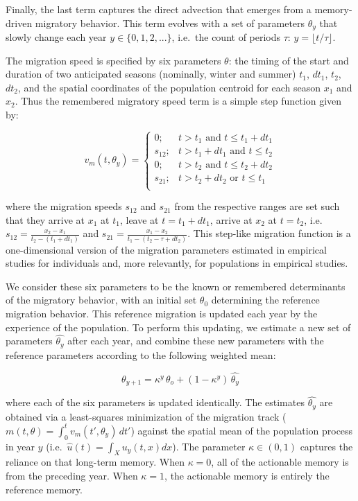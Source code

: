 \documentclass[12pt]{article}
\begin{document}
Finally, the last term captures the direct advection that emerges from a memory-driven migratory behavior. This term evolves with a set of parameters $\theta_y$ that slowly change each year $y \in \{0,1,2,...\}$, i.e.~the count of periods $\tau$: $y = \lfloor t/\tau \rfloor$.

The migration speed is specified by six parameters $\theta$: the timing of the start and duration of two anticipated seasons (nominally, winter and summer) $t_1$, $dt_1$, $t_2$, $dt_2$, and the spatial coordinates of the population centroid for each season $x_1$ and $x_2$. Thus the remembered migratory speed term is a simple step function given by:

\begin{equation}
v_m(t, \theta_y) = \begin{cases}
0; & t > t_1  \,\, \text{and} \,\, t \leq t_1 + dt_1 \\ 
s_{12}; & t > t_1 + dt_1 \,\, \text{and} \,\,  t \leq t_2 \\ 
0; & t> t_2 \,\, \text{and} \,\, t \leq t_2 + dt_2 \\ 
s_{21}; &  t > t_2+dt_2 \,\, \text{or} \,\, t \leq t_1\\ 
\end{cases}
\end{equation}

\noindent where the migration speeds $s_{12}$ and $s_{21}$ from the respective ranges are set such that they arrive at $x_1$ at $t_1$, leave at $t = t_1 + dt_1$, arrive at $x_2$ at $t = t_2$, i.e.~$s_{12} = \frac{x_2-x_1}{t_2 - (t_1 + dt_1)}$ and $s_{21} = \frac{x_1-x_2}{t_1 - (t_2 - \tau + dt_2)}$. This step-like migration function is a one-dimensional version of the migration parameters estimated in empirical studies for individuals \citep{Gurarie2017} and, more relevantly, for populations \citep{Gurarie2019} in empirical studies.

We consider these six parameters to be the known or remembered determinants of the migratory behavior, with an initial set $\theta_0$ determining the reference migration behavior. This reference migration is updated each year by the experience of the population. To perform this updating, we estimate a new set of parameters $\widehat{\theta_y}$ after each year, and combine these new parameters with the reference parameters according to the following weighted mean:

$$\theta_{y+1} = \kappa^y \, \theta_o + \left(1-\kappa^y\right)\,\widehat{\theta_y}$$ 

\noindent where each of the six parameters is updated identically. The estimates $\widehat{\theta_y}$ are obtained via a least-squares minimization of the migration track ($m(t,\theta) = \int_0^t v_m(t',\theta_y) \, dt'$) against the spatial mean of the population process in year $y$ (i.e.~$\widehat{u}(t) = \int_X u_y(t, x) dx$). The parameter $\kappa \in (0,1)$ captures the reliance on that long-term memory. When $\kappa = 0$, all of the actionable memory is from the preceding year. When $\kappa = 1$, the actionable memory is entirely the reference memory.
\end{document}
